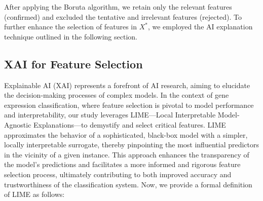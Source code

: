 After applying the Boruta algorithm, we retain only the relevant features (confirmed) and excluded the tentative and irrelevant features (rejected). To further enhance the selection of features in \(X^*\), we employed the AI explanation technique outlined in the following section.


\subsection{XAI for Feature Selection}
Explainable AI (XAI) \cite{dwivedi2023explainable,zacharias2022designing} represents a forefront of AI research, aiming to elucidate the decision-making processes of complex models. In the context of gene expression classification, where feature selection is pivotal to model performance and interpretability, our study leverages LIME—Local Interpretable Model-Agnostic Explanations—to demystify and select critical features. LIME approximates the behavior of a sophisticated, black-box model with a simpler, locally interpretable surrogate, thereby pinpointing the most influential predictors in the vicinity of a given instance. This approach enhances the transparency of the model's predictions and facilitates a more informed and rigorous feature selection process, ultimately contributing to both improved accuracy and trustworthiness of the classification system.  Now, we provide a formal definition of LIME as follows:

